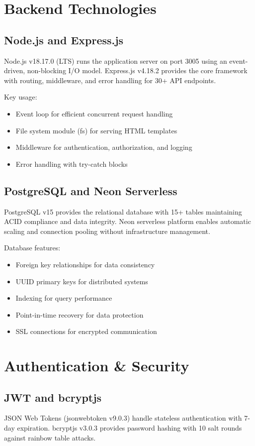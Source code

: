 \section{Backend Technologies}

\subsection{Node.js and Express.js}
Node.js v18.17.0 (LTS) runs the application server on port 3005 using an event-driven, non-blocking I/O model. Express.js v4.18.2 provides the core framework with routing, middleware, and error handling for 30+ API endpoints.

Key usage:
\begin{itemize}
    \item Event loop for efficient concurrent request handling
    \item File system module (fs) for serving HTML templates
    \item Middleware for authentication, authorization, and logging
    \item Error handling with try-catch blocks
\end{itemize}

\subsection{PostgreSQL and Neon Serverless}
PostgreSQL v15 provides the relational database with 15+ tables maintaining ACID compliance and data integrity. Neon serverless platform enables automatic scaling and connection pooling without infrastructure management.

Database features:
\begin{itemize}
    \item Foreign key relationships for data consistency
    \item UUID primary keys for distributed systems
    \item Indexing for query performance
    \item Point-in-time recovery for data protection
    \item SSL connections for encrypted communication
\end{itemize}

\section{Authentication \& Security}

\subsection{JWT and bcryptjs}
JSON Web Tokens (jsonwebtoken v9.0.3) handle stateless authentication with 7-day expiration. bcryptjs v3.0.3 provides password hashing with 10 salt rounds against rainbow table attacks.

